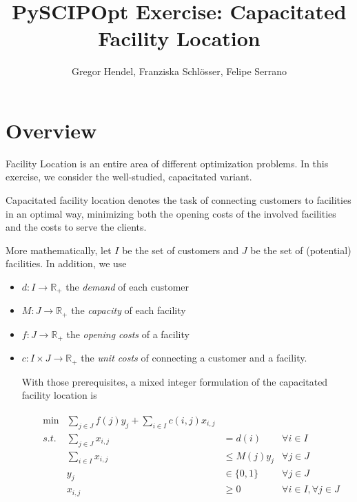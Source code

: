 \documentclass[a4paper,10pt]{article}
\title{PySCIPOpt Exercise: Capacitated Facility Location}
\author{Gregor Hendel, Franziska Schlösser, Felipe Serrano}
\begin{document}
\maketitle




\section{Overview}

Facility Location is an entire area of different optimization problems. In this exercise, we 
consider the well-studied, capacitated variant.

Capacitated facility location denotes the task
of connecting customers to facilities in an optimal way,
minimizing both the opening costs of 
the involved facilities and the costs to serve
the clients.

More mathematically, let $I$ be the set of customers
and $J$ be the set of (potential) facilities. In addition, we use

\begin{itemize}
 \item $d : I \rightarrow \mathbb{R}_{+}$ the \emph{demand} of each customer
 \item $M : J \rightarrow \mathbb{R}_{+}$ the \emph{capacity} of each facility
 \item $f : J \rightarrow \mathbb{R}_{+}$ the \emph{opening costs} of a facility
 \item $c : I \times J \rightarrow \mathbb{R}_{+}$
    the \emph{unit costs} of connecting
    a customer and a facility.
    
With those prerequisites, a mixed integer formulation 
of the capacitated facility location
is

\begin{align}
 \begin{aligned}
  &\min &\sum\limits_{j \in J} f(j) y_{j} + \sum\limits_{i \in I} c(i,j) x_{i,j}\\
  & s.t. & \sum\limits_{j \in J} x_{i,j} &= d(i) & \forall i \in I\\
  && \sum\limits_{i \in I} x_{i,j} &\leq M(j)y_{j} & \forall j \in J\\
  && y_{j} &\in \{0,1\} & \forall j \in J\\
  && x_{i,j} &\geq 0 &\forall i \in I,\forall j \in J  
 \end{aligned}
\end{align}


\end{itemize}
\end{document}
